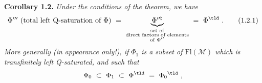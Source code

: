 \bigskip

\textbf{Corollary 1.2.} \textit{Under the conditions of the theorem, we have}
\[
\Phi''' \ \text{(total left Q-saturation of $\Phi$)} \ = \
\underbrace{\Phi^{\prime\prime\natural}}_{\substack{\text{set of}\\ \text{direct factors of elements}\\ \text{of $\Phi''$}}}
\ = \ \Phi^{\tld}\ .
\tag*{(1.2.1)}
\]
\textit{More generally (in appearance only!), if $\Phi_1$ is a subset of \textup{$\mathrm{Fl}(\mathcal{M})$} which is transfinitely left \textup{Q}-saturated, and such that}
\[
\Phi_0 \ \subset \ \Phi_1 \ \subset \ \Phi^{\tld} \ = \ \Phi_0{}^{\tld}\ ,
\]